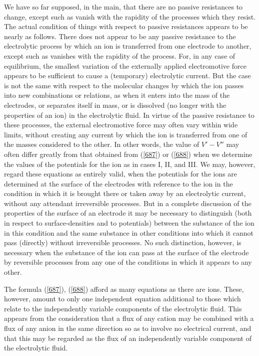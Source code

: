 \documentclass[12pt]{article}
\begin{document}
We have so far supposed, in the main, that there are no passive resistances to change, except such as vanish with the rapidity of the processes which they resist. The actual condition of things with respect to passive resistances appears to be nearly as follows. There does not appear to be any passive resistance to the electrolytic process by which an ion is transferred from one electrode to another, except such as vanishes with the rapidity of the process. For, in any case of equilibrium, the smallest variation of the externally applied electromotive force appears to be sufficient to cause a (temporary) electrolytic current. But the case is not the same with respect to the molecular changes by which the ion passes into new combinations or relations, as when it enters into the mass of the electrodes, or separates itself in mass, or is dissolved (no longer with the properties of an ion) in the electrolytic fluid. In virtue of the passive resistance to these processes, the external electromotive force may often vary within wide limits, without creating any current by which the ion is transferred from one of the masses considered to the other. In other words, the value of $V'- V''$ may often differ greatly from that obtained from (\ref{687}) or (\ref{688}) when we determine the values of the potentials for the ion as in cases I, II, and III. We may, however, regard these equations as entirely valid, when the potentials for the ions are determined at the surface of the electrodes with reference to the ion in the condition in which it is brought there or taken away by an electrolytic current, without any attendant irreversible processes. But in a complete discussion of the properties of the surface of an electrode it may be necessary to distinguish (both in respect to surface-densities and to potentials) between the substance of the ion in this condition and the same substance in other conditions into which it cannot pass (directly) without irreversible processes. No such distinction, however, is necessary when the substance of the ion can pass at the surface of the electrode by reversible processes from any one of the conditions in which it appears to any other.

The formula (\ref{687}), (\ref{688}) afford as many equations as there are ions. These, however, amount to only one independent equation additional to those which relate to the independently variable components of the electrolytic fluid. This appears from the consideration that a flux of any cation may be combined with a flux of any anion in the same direction so as to involve no electrical current, and that this may be regarded as the flux of an independently variable component of the electrolytic fluid.
\end{document}
